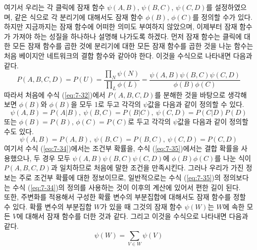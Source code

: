 \documentclass[a4paper]{oblivoir}
\begin{document}
여기서 우리는 각 클릭에 잠재 함수 $\psi(A,B)$, $\psi(B,C)$, $\psi(C,D)$를 설정하였으며, 같은 식으로 각 분리기에 대해서도 잠재 함수 $\phi(B)$, $\phi(C)$를 정의할 수가 있다. 하지만 지금까지는 잠재 함수에 어떠한 의미도 부여하지 않았으며, 이제부터 잠재 함수가 가져야 하는 성질을 하나하나 설명해 나가도록 하겠다. 먼저 잠재 함수는 클릭에 대한 모든 잠재 함수를 곱한 것에 분리기에 대한 모든 잠재 함수를 곱한 것을 나눈 함수는 처음 베이지안 네트워크의 결합 함수와 같아야 한다. 이것을 수식으로 나타내면 다음과 같다. 
\begin{equation}
P(A,B,C,D) = P(U) = \frac{ \prod_{N} \psi(N) }{ \prod_{L} \phi(L) } = \frac{\psi(A,B)\psi(B,C)\psi(C,D) }{ \phi(B) \phi(C) }
\label{eq:7-33}
\end{equation} 
따라서 처음에 수식 (\ref{eq:7-32})에서 $P(A,B,C,D)$를 분해한 것을 바탕으로 생각해 보면 $\phi(B)$와 $\phi(B)$을 모두 1로 두고 각각의 $\psi$값을 다음과 같이 정의할 수 있다. 
\begin{equation}
\psi(A,B) = P(A|B), \ \psi(B,C) = P(B|C), \ \psi(C,D) = P(C|D) P(D)
\label{eq:7-34}
\end{equation} 
또는 $\phi(B)=P(B)$, $\phi(C)=P(C)$로 두고 각각의 $\psi$값을 다음과 같이 정의할 수도 있다.  
\begin{equation}
\psi(A,B) = P(A, B), \ \psi(B,C) = P(B, C), \ \psi(C,D) = P(C, D)
\label{eq:7-35}
\end{equation} 
여기서 수식 (\ref{eq:7-34})에서는 조건부 확률을, 수식 (\ref{eq:7-35})에서는 결합 확률을 사용했으나, 두 경우 모두 $\psi(A,B)\psi(B,C)\psi(C,D)$에 $\phi(B) \phi(C)$를 나눈 식이 $P(A,B,C,D)$과 일치하므로 처음에 말한 조건을 만족시킨다. 그러나 우리가 가진 정보는 주로 조건부 확률에 대한 정보이므로, 일반적으로는 수식 (\ref{eq:7-35})의 정의보다는 수식 (\ref{eq:7-34})의 정의를 사용하는 것이 이후의 계산에 있어서 편한 길이 된다. \\

또한, 주변화를 적용해서 구성한 확률 변수의 부분집합에 대해서도 잠재 함수를 정할 수 있다. 확률 변수의 부분집합 $W$가 있을 때 그것의 잠재 함수 $\psi(W)$는 $W$에 속한 모든 $V$에 대해서 잠재 함수를 더한 것과 같다. 그리고 이것을 수식으로 나타내면 다음과 같다.  
\begin{equation}
\psi(W) = \sum_{V \in W} \psi(V)
\label{eq:7-36}
\end{equation} \\  
\end{document}
